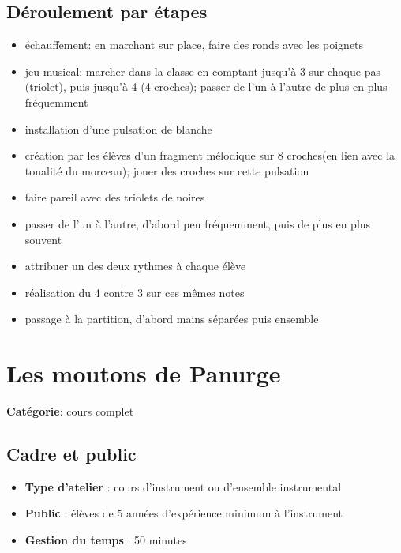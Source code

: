 \documentclass[a4paper,11pt,bibliography=totoc,numbers=noenddot,listof=flat,DIV=11,BCOR=0mm]{scrreprt}%
\begin{document}
\section*{Déroulement par étapes}
\begin{itemize}
\item échauffement: en marchant sur place, faire des ronds avec les poignets
\item jeu musical: marcher dans la classe en comptant jusqu'à 3 sur chaque pas (triolet), puis jusqu'à 4 (4 croches); passer de l'un à l'autre de plus en plus fréquemment
\item installation d'une pulsation de blanche
\item création par les élèves d'un fragment mélodique sur 8 croches(en lien avec la tonalité du morceau); jouer des croches sur cette pulsation
\item faire pareil avec des triolets de noires
\item passer de l'un à l'autre, d'abord peu fréquemment, puis de plus en plus souvent
\item attribuer un des deux rythmes à chaque élève
\item réalisation du 4 contre 3 sur ces mêmes notes
\item passage à la partition, d'abord mains séparées puis ensemble
\end{itemize}

\chapter[Cours complet: Les moutons de Panurge]{Les moutons de Panurge}


{\large \textbf{Catégorie}}:
cours complet

\section*{Cadre et public}
\begin{itemize}
\item [\textbullet]\textbf{Type d'atelier} : cours d'instrument ou d'ensemble instrumental

\item [\textbullet]\textbf{Public} : élèves de 5 années d'expérience minimum à l'instrument

\item [\textbullet]\textbf{Gestion du temps} : 50 minutes

\end{itemize}
\end{document}
